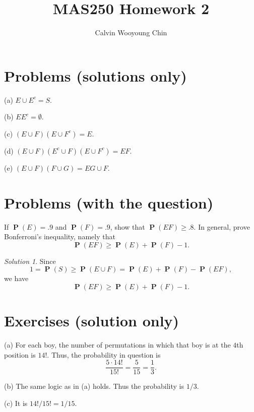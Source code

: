 \documentclass{amsart}
\theoremstyle{definition}
\newenvironment{exercise}[1]
	{\renewcommand\theinnerexercise{#1}\innerexercise}
	{\endinnerexercise}
\newenvironment{problem}[1]
	{\renewcommand\theinnerproblem{#1}\innerproblem}
	{\endinnerproblem}
\theoremstyle{remark}
\newtheorem*{solution}{Solution}
\DeclareMathOperator{\PP}{\mathbf{P}}
\begin{document}
\title{MAS250 Homework 2}
\author{Calvin Wooyoung Chin}
\maketitle

\section{Problems (solutions only)}

\begin{problem}{7}
(a) $E \cup E^c = S$.

(b) $EE^c = \emptyset$.

(c) $(E\cup F)(E\cup F^c) = E$.

(d) $(E\cup F)(E^c\cup F)(E\cup F^c) = EF$.

(e) $(E\cup F)(F\cup G) = EG\cup F$.
\end{problem}

\section{Problems (with the question)}

\begin{problem}{12}
If $\PP(E)=.9$ and $\PP(F)=.9$, show that $\PP(EF)\ge.8$.
In general, prove Bonferroni's inequality, namely that
\[ \PP(EF) \ge \PP(E) + \PP(F) - 1. \]
\end{problem}

\begin{solution}
Since
\[ 1 = \PP(S) \ge \PP(E\cup F) = \PP(E)+\PP(F) - \PP(EF), \]
we have
\[ \PP(EF) \ge \PP(E)+\PP(F)-1. \]
\end{solution}

\section{Exercises (solution only)}

\begin{exercise}{18}
(a) For each boy, the number of permutations in which that boy is at the $4$th
position is $14!$.
Thus, the probability in question is
\[ \frac{5\cdot 14!}{15!} = \frac{5}{15} = \frac{1}{3}. \]

(b) The same logic as in (a) holds. Thus the probability is $1/3$.

(c) It is $14!/15! = 1/15$.
\end{exercise}
\end{document}
